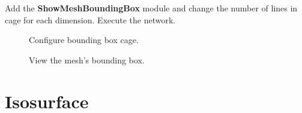 \documentclass[fleqn,11pt,openany]{book}
\begin{document}
Add the \textbf{ShowMeshBoundingBox} module and change the number
of lines in cage for each dimension.
Execute the network.

\begin{figure}[H]
\caption{Configure bounding box cage.}
\label{fig:addbbox}
\end{figure}

\begin{figure}[H]
\caption{View the mesh's bounding box.}
\label{fig:viewbbox}
\end{figure}

\section{Isosurface}\label{isosurface}
\end{document}
